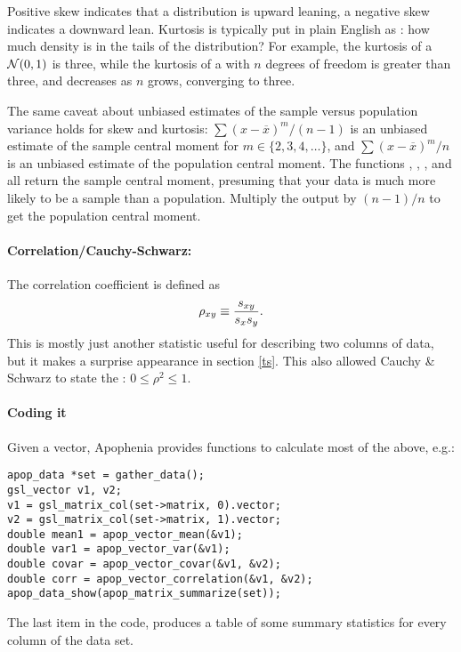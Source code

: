 Positive skew indicates that a distribution is upward leaning, a negative
skew indicates a downward lean. Kurtosis is typically put in plain
English as : how much density is in the tails of the
distribution? For example, the kurtosis of a ${\cal N}(0,1)$ is three,
while the kurtosis of a  with $n$ degrees of
freedom is greater than three, and decreases as $n$ grows, converging to
three.

 
 
\label{kurtskew}
The same caveat about unbiased estimates of the sample versus population
variance holds for skew and kurtosis: $\sum (x-\overline x)^m/(n-1)$
is an unbiased estimate of the sample central moment for $m \in\{2, 3,
4, \dots\}$, and $\sum (x-\overline x)^m/n$ is an unbiased estimate of
the population central moment. The functions
,
,
, and
 all return the sample central
moment, presuming that your data is much more likely to be a sample than
a population. Multiply the output by $(n-1)/n$ to get the population
central moment.

\paragraph{Correlation/Cauchy-Schwarz:} The correlation coefficient is
defined as $$\rho_{xy}\equiv{s_{xy}\over s_x s_y}.$$ This is mostly just another
statistic useful for describing two columns of data,
but it makes a surprise appearance in section \ref{ts}. This
also allowed Cauchy \& Schwarz to state the : $0\leq \rho^2 \leq 1$.  \label{correlation}

\paragraph{Coding it} Given a vector, Apophenia provides functions to
calculate most of the above, e.g.:

\begin{lstlisting}
apop_data *set = gather_data();
gsl_vector v1, v2;
v1 = gsl_matrix_col(set->matrix, 0).vector;
v2 = gsl_matrix_col(set->matrix, 1).vector;
double mean1 = apop_vector_mean(&v1);
double var1 = apop_vector_var(&v1);
double covar = apop_vector_covar(&v1, &v2);
double corr = apop_vector_correlation(&v1, &v2);
apop_data_show(apop_matrix_summarize(set));
\end{lstlisting}
The last item in the code,  produces a table of
some summary statistics for every column of the data set.

